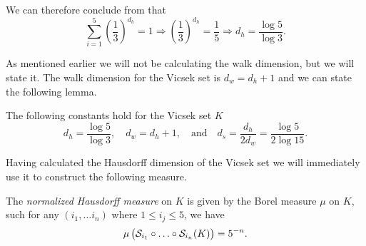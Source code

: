We can therefore conclude from  that 
\begin{equation}
	\sum_{i=1}^{5} \left(\frac{1}{3}\right)^{d_h} = 1 \Rightarrow \left(\frac{1}{3}\right)^{d_h} = \frac{1}{5} \Rightarrow d_h = \frac{\log 5}{\log 3}.
\end{equation}

As mentioned earlier we will not be calculating the walk dimension, but we will state it. The walk dimension for the Vicsek set is $d_w = d_h +1$ and we can state the following lemma.

\medskip
\begin{lemma}\label{defiDimensionsOfVicsek}
		The following constants hold for the Vicsek set $K$
		\begin{equation}
			d_h= \frac{\log 5}{\log 3}, \quad d_w = d_h +1, \quad \text{and} \quad d_s = \frac{d_h}{2d_w} = \frac{\log 5}{2 \log 15}.
		\end{equation}
\end{lemma}

Having calculated the Hausdorff dimension of the Vicsek set we will immediately use it to construct the following measure.

\medskip
\begin{defi}\label{normalziedHausdorffMeasure}
	The \emph{normalized Hausdorff measure} on $K$ is given by the Borel measure $\mu$ on $K$, such for any $(i_1, \ldots i_n)$ where $1 \leq i_j \leq 5$, we have
	\begin{equation}
		\mu\left(\mathcal{S}_{i_1} \circ \ldots \circ \mathcal{S}_{i_n}(K)\right) = 5^{-n}.
	\end{equation}
\end{defi}

